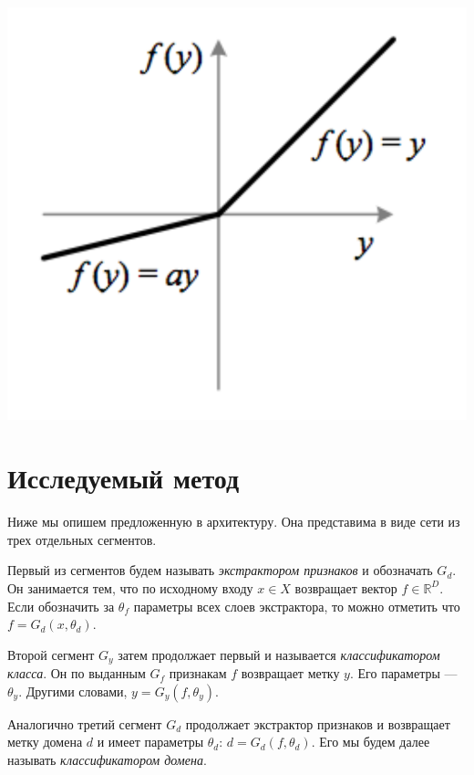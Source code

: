 \documentclass[14pt, a4paper]{extarticle}
\begin{document}
\begin{center}
	\includegraphics[scale=0.5]{images/prelu.png}
\end{center}

\newpage
\section{Исследуемый метод}
\label{paragraph:method}
 
Ниже мы опишем предложенную в \cite{ganin} архитектуру. Она представима в виде сети из трех отдельных сегментов.
 
Первый из сегментов будем называть \textit{экстрактором признаков} и обозначать $G_d$. Он занимается тем, что по исходному входу $x \in X$ возвращает вектор $f \in \mathbb{R}^D$. Если обозначить за $\theta_f$ параметры всех слоев экстрактора, то можно отметить что $f = G_d(x, \theta_d)$.
 
Второй сегмент $G_y$ затем продолжает первый и называется \textit{классификатором класса}. Он по выданным $G_f$ признакам $f$ возвращает метку $y$. Его параметры — $\theta_y$. Другими словами, $y = G_y(f, \theta_y)$.
 
Аналогично третий сегмент $G_d$ продолжает экстрактор признаков и возвращает метку домена $d$ и имеет параметры $\theta_d$: $d = G_d(f, \theta_d)$. Его мы будем далее называть \textit{классификатором домена}.
\end{document}
